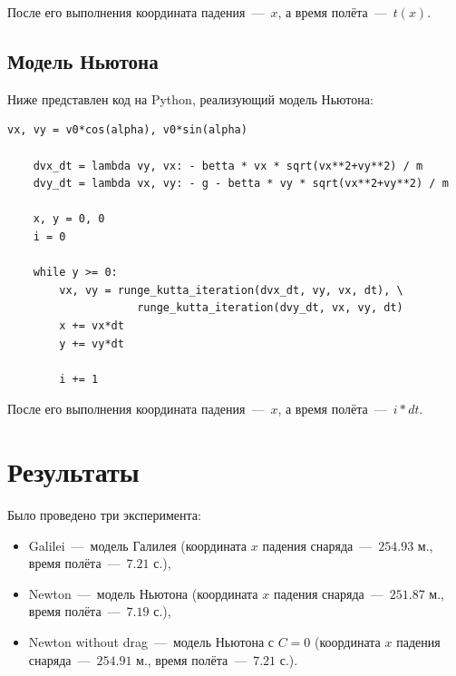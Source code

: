 \documentclass[12pt,a4paper,oneside]{extarticle}
\begin{document}
    После его выполнения координата падения~---~$x$, а время полёта~---~$t(x)$.

    \subsection{Модель Ньютона}
    Ниже представлен код на Python, реализующий модель Ньютона:

    \lstset{language=Python}
        \begin{lstlisting}[mathescape] 
    vx, vy = v0*cos(alpha), v0*sin(alpha)

    dvx_dt = lambda vy, vx: - betta * vx * sqrt(vx**2+vy**2) / m
    dvy_dt = lambda vx, vy: - g - betta * vy * sqrt(vx**2+vy**2) / m

    x, y = 0, 0
    i = 0

    while y >= 0:
        vx, vy = runge_kutta_iteration(dvx_dt, vy, vx, dt), \
                    runge_kutta_iteration(dvy_dt, vx, vy, dt) 
        x += vx*dt
        y += vy*dt

        i += 1
    \end{lstlisting}

    После его выполнения координата падения~---~$x$, а время полёта~---~$i*dt$.

\section{Результаты}
    Было проведено три эксперимента:
    \begin{itemize}
        \item Galilei~---~модель Галилея (координата $x$ падения снаряда~---~$254.93$ м., время полёта~---~$7.21$ с.),
        \item Newton~---~модель Ньютона (координата $x$ падения снаряда~---~$251.87$ м., время полёта~---~$7.19$ с.),
        \item Newton without drag~---~модель Ньютона с $C=0$ (координата $x$ падения снаряда~---~$254.91$ м., время полёта~---~$7.21$ с.).
    \end{itemize}
\end{document}
